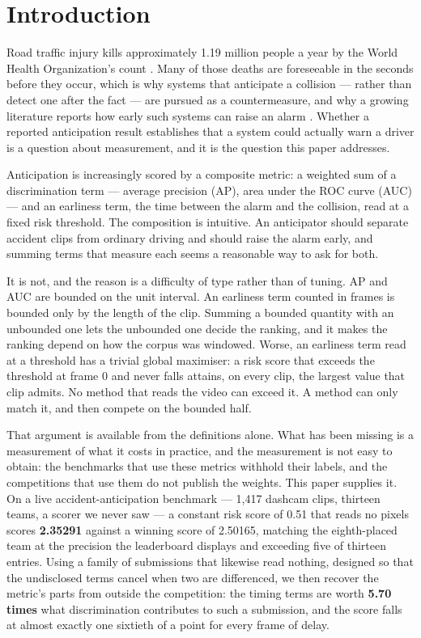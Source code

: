 \section{Introduction}

Road traffic injury kills approximately 1.19 million people a year by the World Health Organization's count \citep{who2023}. Many of those deaths are foreseeable in the seconds before they occur, which is why systems that anticipate a collision --- rather than detect one after the fact --- are pursued as a countermeasure, and why a growing literature reports how early such systems can raise an alarm \citep{zhang2025review}. Whether a reported anticipation result establishes that a system could actually warn a driver is a question about measurement, and it is the question this paper addresses.

Anticipation is increasingly scored by a composite metric: a weighted sum of a discrimination term --- average precision (AP), area under the ROC curve (AUC) --- and an earliness term, the time between the alarm and the collision, read at a fixed risk threshold. The composition is intuitive. An anticipator should separate accident clips from ordinary driving and should raise the alarm early, and summing terms that measure each seems a reasonable way to ask for both.

It is not, and the reason is a difficulty of type rather than of tuning. AP and AUC are bounded on the unit interval. An earliness term counted in frames is bounded only by the length of the clip. Summing a bounded quantity with an unbounded one lets the unbounded one decide the ranking, and it makes the ranking depend on how the corpus was windowed. Worse, an earliness term read at a threshold has a trivial global maximiser: a risk score that exceeds the threshold at frame 0 and never falls attains, on every clip, the largest value that clip admits. No method that reads the video can exceed it. A method can only match it, and then compete on the bounded half.

That argument is available from the definitions alone. What has been missing is a measurement of what it costs in practice, and the measurement is not easy to obtain: the benchmarks that use these metrics withhold their labels, and the competitions that use them do not publish the weights. This paper supplies it. On a live accident-anticipation benchmark --- 1,417 dashcam clips, thirteen teams, a scorer we never saw --- a constant risk score of 0.51 that reads no pixels scores \textbf{2.35291} against a winning score of 2.50165, matching the eighth-placed team at the precision the leaderboard displays and exceeding five of thirteen entries. Using a family of submissions that likewise read nothing, designed so that the undisclosed terms cancel when two are differenced, we then recover the metric's parts from outside the competition: the timing terms are worth \textbf{5.70 times} what discrimination contributes to such a submission, and the score falls at almost exactly one sixtieth of a point for every frame of delay.

